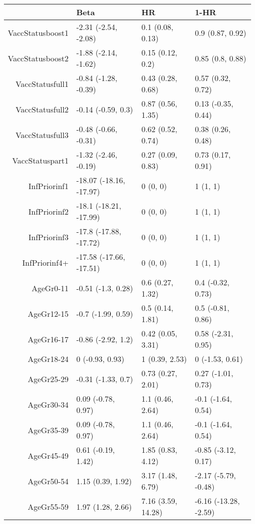\begin{table}[ht]
\centering
\begin{tabular}{rlll}
  \hline
 & Beta & HR & 1-HR \\ 
  \hline
VaccStatusboost1 & -2.31 (-2.54, -2.08) & 0.1 (0.08, 0.13) & 0.9 (0.87, 0.92) \\ 
  VaccStatusboost2 & -1.88 (-2.14, -1.62) & 0.15 (0.12, 0.2) & 0.85 (0.8, 0.88) \\ 
  VaccStatusfull1 & -0.84 (-1.28, -0.39) & 0.43 (0.28, 0.68) & 0.57 (0.32, 0.72) \\ 
  VaccStatusfull2 & -0.14 (-0.59, 0.3) & 0.87 (0.56, 1.35) & 0.13 (-0.35, 0.44) \\ 
  VaccStatusfull3 & -0.48 (-0.66, -0.31) & 0.62 (0.52, 0.74) & 0.38 (0.26, 0.48) \\ 
  VaccStatuspart1 & -1.32 (-2.46, -0.19) & 0.27 (0.09, 0.83) & 0.73 (0.17, 0.91) \\ 
  InfPriorinf1 & -18.07 (-18.16, -17.97) & 0 (0, 0) & 1 (1, 1) \\ 
  InfPriorinf2 & -18.1 (-18.21, -17.99) & 0 (0, 0) & 1 (1, 1) \\ 
  InfPriorinf3 & -17.8 (-17.88, -17.72) & 0 (0, 0) & 1 (1, 1) \\ 
  InfPriorinf4+ & -17.58 (-17.66, -17.51) & 0 (0, 0) & 1 (1, 1) \\ 
  AgeGr0-11 & -0.51 (-1.3, 0.28) & 0.6 (0.27, 1.32) & 0.4 (-0.32, 0.73) \\ 
  AgeGr12-15 & -0.7 (-1.99, 0.59) & 0.5 (0.14, 1.81) & 0.5 (-0.81, 0.86) \\ 
  AgeGr16-17 & -0.86 (-2.92, 1.2) & 0.42 (0.05, 3.31) & 0.58 (-2.31, 0.95) \\ 
  AgeGr18-24 & 0 (-0.93, 0.93) & 1 (0.39, 2.53) & 0 (-1.53, 0.61) \\ 
  AgeGr25-29 & -0.31 (-1.33, 0.7) & 0.73 (0.27, 2.01) & 0.27 (-1.01, 0.73) \\ 
  AgeGr30-34 & 0.09 (-0.78, 0.97) & 1.1 (0.46, 2.64) & -0.1 (-1.64, 0.54) \\ 
  AgeGr35-39 & 0.09 (-0.78, 0.97) & 1.1 (0.46, 2.64) & -0.1 (-1.64, 0.54) \\ 
  AgeGr45-49 & 0.61 (-0.19, 1.42) & 1.85 (0.83, 4.12) & -0.85 (-3.12, 0.17) \\ 
  AgeGr50-54 & 1.15 (0.39, 1.92) & 3.17 (1.48, 6.79) & -2.17 (-5.79, -0.48) \\ 
  AgeGr55-59 & 1.97 (1.28, 2.66) & 7.16 (3.59, 14.28) & -6.16 (-13.28, -2.59) \\ 

\end{tabular}
\end{table}
